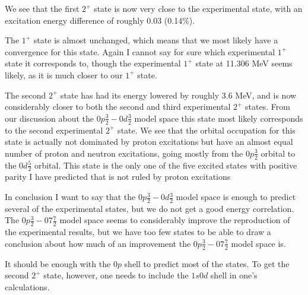 We see that the first $2^+$ state is now very close to the experimental state,
with an excitation energy difference of roughly 0.03 (0.14\%).

The $1^+$ state is almost unchanged, which means that we most likely have a
convergence for this state. Again I cannot say for sure which experimental
$1^+$ state it corresponds to, though the experimental $1^+$ state at 11.306
MeV seems likely, as it is much closer to our $1^+$ state.

The second $2^+$ state has had its energy lowered by roughly 3.6 MeV, and is now
considerably closer to both the second and third experimental $2^+$ states.
From our discussion about the $0p\frac32-0d\frac32$ model space this state most
likely corresponds to the second experimental $2^+$ state. We see that the
orbital occupation for this state is actually not dominated by proton
excitations but have an almost equal number of proton and neutron excitations,
going mostly from the $0p\frac32$ orbital to the $0d\frac52$ orbital. This state is
the only one of the five excited states with positive parity I have predicted that
is not ruled by proton excitations

In conclusion I want to say that the $0p\frac32-0d\frac32$ model space is
enough to predict several of the experimental states, but we do not get a good
energy correlation. The $0p\frac32-07\frac72$ model space seems to considerably
improve the reproduction of the experimental results, but we have too few states to be able to draw
a conclusion about how much of an improvement the $0p\frac32-07\frac72$ model
space is.

It should be enough with the $0p$ shell to predict most of the states. To get
the second $2^+$ state, however, one needs to include the $1s0d$ shell in one's
calculations.

